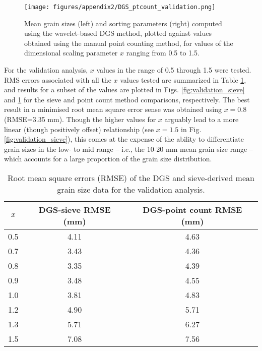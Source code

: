\documentclass[preprint,12pt,authoryear]{elsarticle}
\begin{document}
\begin{figure}
	\texttt{[image: figures/appendix2/DGS\_ptcount\_validation.png]}
	\caption[Mean grain size and sorting: wavelet method versus manual point count]{Mean grain sizes (left) and sorting parameters (right) computed using the wavelet-based DGS method, plotted against values obtained using the manual point counting method, for values of the dimensional scaling parameter $x$ ranging from 0.5 to 1.5. \label{fig:validation_ptcount}}
\end{figure}

For the validation analysis, $x$ values in the range of 0.5 through 1.5 were tested. RMS errors associated with all the $x$ values tested are summarized in Table \ref{table:rmse}, and results for a subset of the values are plotted in Figs. \ref{fig:validation_sieve} and \ref{fig:validation_ptcount} for the sieve and point count method comparisons, respectively. The best result in a minimised root mean square error sense was obtained using $x=0.8$ (RMSE=3.35 mm). Though the higher values for $x$ arguably lead to a more linear (though positively offset) relationship (see $x=1.5$ in Fig. \ref{fig:validation_sieve}), this comes at the expense of the ability to differentiate grain sizes in the low- to mid range -- i.e., the 10-20 mm mean grain size range -- which accounts for a large proportion of the grain size distribution. %

\begin{table}[tbp!]
	\caption[RMS errors: mean grain size data from wavelet method and sieve]{Root mean square errors (RMSE) of the DGS and sieve-derived mean grain size data for the validation analysis.} 
	\label{table:rmse}
	\centering
	\begin{tabular}{ccc}
		\hline
		$x$ & DGS-sieve RMSE (mm) & DGS-point count RMSE (mm)\\
		\hline
		0.5 & 4.11 & 4.63\\
		0.7 & 3.43 & 4.36\\
		0.8 & 3.35 & 4.39\\
		0.9 & 3.48 & 4.55\\
		1.0 & 3.81 & 4.83\\
		1.2 & 4.90 & 5.71\\
		1.3 & 5.71 & 6.27\\
		1.5 & 7.08 & 7.56\\
	\end{tabular}
\end{table}
\end{document}
